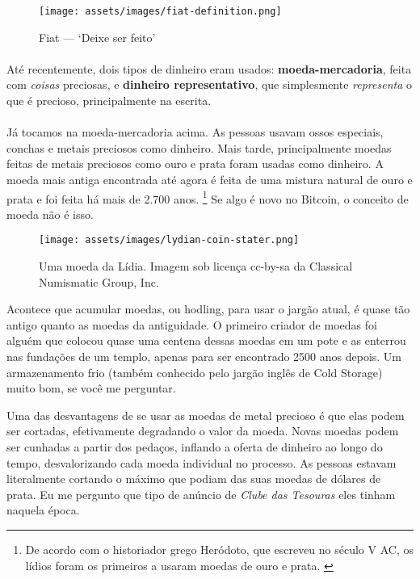 \begin{figure}
  \centering
  \texttt{[image: assets/images/fiat-definition.png]}
  \caption{Fiat --- `Deixe ser feito'}
  \label{fig:fiat-definition}
\end{figure}

\paragraph{}
Até recentemente, dois tipos de dinheiro eram usados: \textbf{moeda-mercadoria}, feita com \textit{coisas} preciosas, e \textbf{dinheiro representativo}, que simplesmente \textit{representa} o que é precioso, principalmente na escrita.

\paragraph{}
Já tocamos na moeda-mercadoria acima. As pessoas usavam ossos especiais, conchas e metais preciosos como dinheiro. Mais tarde, principalmente moedas feitas de metais preciosos como ouro e prata foram usadas como dinheiro. A moeda mais antiga encontrada até agora é feita de uma mistura natural de ouro e prata e foi feita há mais de 2.700 anos. \footnote{De acordo com o historiador grego Heródoto, que escreveu no século V AC, os lídios foram os primeiros a usaram moedas de ouro e prata. \cite{coinage-origins}} Se algo é novo no Bitcoin, o conceito de moeda não é isso.

\begin{figure}
  \centering
  \texttt{[image: assets/images/lydian-coin-stater.png]}
  \caption{Uma moeda da Lídia. Imagem sob licença cc-by-sa da Classical Numismatic Group, Inc.}
  \label{fig:lydian-coin-stater}
\end{figure}

Acontece que acumular moedas, ou hodling, para usar o jargão atual, é quase tão antigo quanto as moedas da antiguidade. O primeiro criador de moedas foi alguém que colocou quase uma centena dessas moedas em um pote e as enterrou nas fundações de um templo, apenas para ser encontrado 2500 anos depois. Um armazenamento frio (também conhecido pelo jargão inglês de Cold Storage) muito bom, se você me perguntar.

Uma das desvantagens de se usar as moedas de metal precioso é que elas podem ser cortadas, efetivamente degradando o valor da moeda. Novas moedas podem ser cunhadas a partir dos pedaços, inflando a oferta de dinheiro ao longo do tempo, desvalorizando cada moeda individual no processo. As pessoas estavam literalmente cortando o máximo que podiam das suas moedas de dólares de prata. Eu me pergunto que tipo de anúncio de \textit{Clube das Tesouras} eles tinham naquela época.


